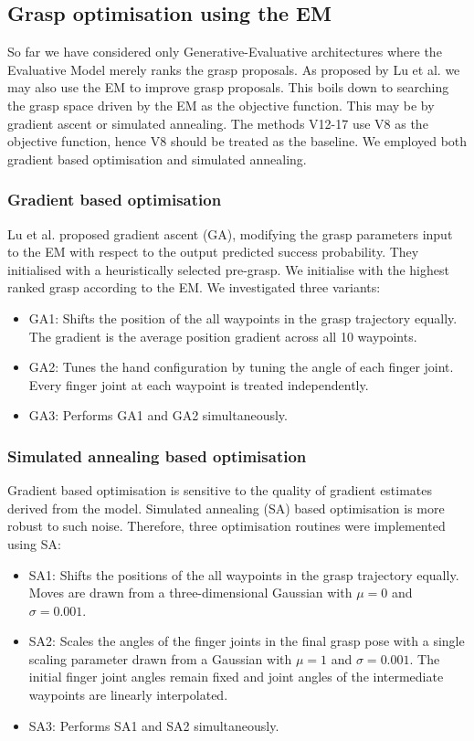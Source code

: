 \subsection{Grasp optimisation using the EM}
\noindent
So far we have considered only Generative-Evaluative architectures where the Evaluative Model merely ranks the grasp proposals. As proposed by Lu et al. \cite{lu2017planning} we may also use the EM to improve grasp proposals. This boils down to searching the grasp space driven by the EM as the objective function. This may be by gradient ascent or simulated annealing. The methods V12-17 use V8 as the objective function, hence V8 should be treated as the baseline. We employed both gradient based optimisation and simulated annealing.

\subsubsection{Gradient based optimisation}
\noindent
Lu et al. \cite{lu2017planning} proposed gradient ascent (GA), modifying the grasp parameters input to the EM with respect to the output predicted success probability. They initialised with a heuristically selected pre-grasp. We initialise with the highest ranked grasp according to the EM. We investigated three variants:
\begin{itemize}
\item GA1: Shifts the position of the all waypoints in the grasp trajectory equally. The gradient is the average position gradient across all 10 waypoints.
\item GA2: Tunes the hand configuration by tuning the angle of each finger joint. Every finger joint at each waypoint is treated independently.
\item GA3: Performs GA1 and GA2 simultaneously.
\end{itemize}

\subsubsection{Simulated annealing based optimisation}
\noindent
Gradient based optimisation is sensitive to the quality of gradient estimates derived from the model. Simulated annealing (SA) based optimisation is more robust to such noise. Therefore, three optimisation routines were implemented using SA:
\begin{itemize}
\item SA1: Shifts the positions of the all waypoints in the grasp trajectory equally. Moves are drawn from a three-dimensional Gaussian with $\mu=0$ and $\sigma=0.001$. 
\item SA2: Scales the angles of the finger joints in the final grasp pose with a single scaling parameter drawn from a Gaussian with $\mu=1$ and $\sigma=0.001$. The initial finger joint angles remain fixed and joint angles of the intermediate waypoints are linearly interpolated. 
\item SA3: Performs SA1 and SA2 simultaneously.
\end{itemize}
